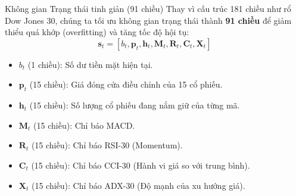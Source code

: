 \documentclass[10pt,aspectratio=169]{beamer}
\begin{document}
\begin{frame}{Không gian Trạng thái tinh giản (91 chiều)}
  Thay vì cấu trúc 181 chiều như rổ Dow Jones 30, chúng ta tối ưu không gian trạng thái thành \textbf{91 chiều} để giảm thiểu quá khớp (overfitting) và tăng tốc độ hội tụ:
  $$\mathbf{s}_t = [b_t, \mathbf{p}_t, \mathbf{h}_t, \mathbf{M}_t, \mathbf{R}_t, \mathbf{C}_t, \mathbf{X}_t]$$
  \vspace{0.2cm}
  \begin{itemize}
    \item $b_t$ (1 chiều): Số dư tiền mặt hiện tại.
    \item $\mathbf{p}_t$ (15 chiều): Giá đóng cửa điều chỉnh của 15 cổ phiếu.
    \item $\mathbf{h}_t$ (15 chiều): Số lượng cổ phiếu đang nắm giữ của từng mã.
    \item $\mathbf{M}_t$ (15 chiều): Chỉ báo MACD.
    \item $\mathbf{R}_t$ (15 chiều): Chỉ báo RSI-30 (Momentum).
    \item $\mathbf{C}_t$ (15 chiều): Chỉ báo CCI-30 (Hành vi giá so với trung bình).
    \item $\mathbf{X}_t$ (15 chiều): Chỉ báo ADX-30 (Độ mạnh của xu hướng giá).
  \end{itemize}
\end{frame}
\end{document}
